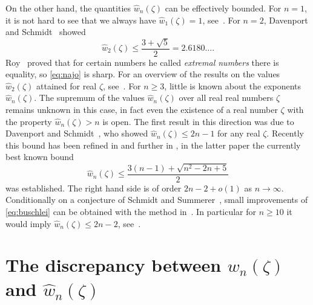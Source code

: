 \documentclass[12pt]{amsart}
\theoremstyle{definition}
\begin{document}
On the other hand,
the quantities $\widehat{w}_{n}(\zeta)$ can be effectively bounded.
For $n=1$, it is not hard to see that we always 
have $\widehat{w}_{1}(\zeta)=1$, see~\cite{khin}.
For $n=2$, Davenport and Schmidt~\cite{davsh} showed 
\begin{equation} \label{eq:najo}
\widehat{w}_{2}(\zeta)\leq \frac{3+\sqrt{5}}{2}= 2.6180\ldots.
\end{equation}
Roy~\cite{royyy} proved that for certain numbers 
he called {\em extremal numbers} there is equality, so \eqref{eq:najo} is sharp. For an overview of the results
on the values $\widehat{w}_{2}(\zeta)$ attained for real $\zeta$, see~\cite[Section~2.4]{bdraft}. 
For $n\geq 3$, little is known about the 
exponents $\widehat{w}_{n}(\zeta)$. 
The supremum of the values $\widehat{w}_{n}(\zeta)$ over all real real numbers $\zeta$ remains unknown in this case,
in fact even the existence of a real number $\zeta$ 
with the property $\widehat{w}_{n}(\zeta)>n$
is open. The first result in this direction was due to Davenport and Schmidt~\cite{davsh},
who showed $\widehat{w}_{n}(\zeta)\leq 2n-1$ for any real $\zeta$.
Recently this bound has been refined in \cite{buschl} and further
in \cite{9},  
in the latter paper the currently best known bound
\begin{equation} \label{eq:buschlei}
\widehat{w}_{n}(\zeta)\leq \frac{3(n-1)+\sqrt{n^{2}-2n+5}}{2}
\end{equation}
was established.
The right hand side is of order $2n-2+o(1)$ as $n\to\infty$.   Conditionally on a conjecture of Schmidt and Summerer~\cite{sums},
small improvements of \eqref{eq:buschlei} can be obtained
with the method in~\cite{buschl}. In particular
for $n\geq 10$ it would imply $\widehat{w}_{n}(\zeta)\leq 2n-2$, see~\cite[Theorem~3.1]{iich}.


\section{The discrepancy between $w_{n}(\zeta)$ and $\widehat{w}_{n}(\zeta)$}
\end{document}
